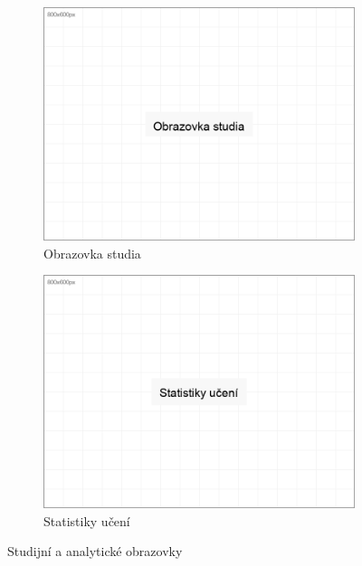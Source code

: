 \documentclass[12pt, a4paper, twoside, openright]{report}
\begin{document}
	\begin{figure}[h]
		\centering
		\begin{subfigure}[b]{0.48\textwidth}
			\includegraphics[width=\linewidth]{image/screen-study.png}
			\caption{Obrazovka studia}
			\label{fig:screen-study}
		\end{subfigure}
		\hfill
		\begin{subfigure}[b]{0.48\textwidth}
			\includegraphics[width=\linewidth]{image/screen-statistics.png}
			\caption{Statistiky učení}
			\label{fig:screen-stats}
		\end{subfigure}
		\caption{Studijní a analytické obrazovky}
		\label{fig:study-screens}
	\end{figure}
\end{document}
